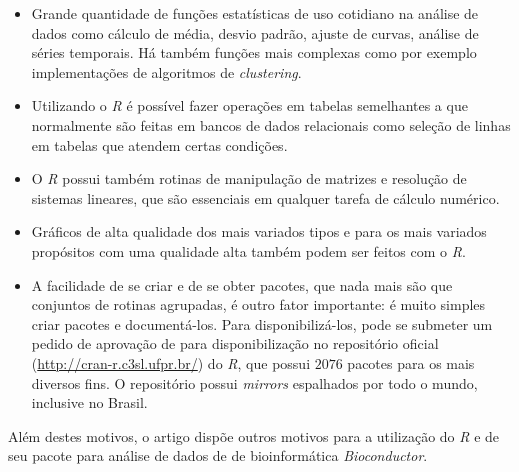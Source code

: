 \begin{itemize}
  \item Grande quantidade de funções estatísticas de uso cotidiano na análise de dados
como cálculo de média, desvio padrão, ajuste de curvas, análise de séries temporais. Há também funções mais complexas como por 
exemplo implementações de algoritmos de \emph{clustering}. 
  \item Utilizando o \emph{R} é possível fazer operações em tabelas semelhantes a que normalmente 
são feitas em bancos de dados relacionais como seleção de linhas em tabelas que atendem
certas condições. 
  \item O \emph{R} possui também rotinas de manipulação de matrizes e resolução de sistemas lineares, que são essenciais
em qualquer tarefa de cálculo numérico. 
  \item Gráficos de alta qualidade dos mais variados tipos e para os mais variados propósitos com uma qualidade alta 
também podem ser feitos com o \emph{R}. 
  \item A facilidade de se criar e de se obter pacotes, que nada mais são que conjuntos de rotinas agrupadas, é outro fator
importante: é muito simples criar pacotes e documentá-los. Para disponibilizá-los, pode se submeter um pedido de aprovação 
de para disponibilização no repositório oficial (\url{http://cran-r.c3sl.ufpr.br/})  
do \emph{R}, que possui $2076$ pacotes para os mais diversos fins. O repositório possui \emph{mirrors} espalhados por
todo o mundo, inclusive no Brasil.  
\end{itemize}

Além destes motivos, o artigo \cite{bioconductor} dispõe outros motivos para a utilização do \emph{R} e de seu
pacote para análise de dados de de bioinformática \emph{Bioconductor}.

